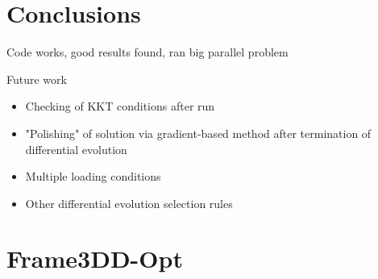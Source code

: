 \documentclass{article}
\begin{document}
\section{Conclusions}
Code works, good results found, ran big parallel problem

Future work
\begin{itemize}
  \item Checking of KKT conditions after run
  \item "Polishing" of solution via gradient-based method after termination of differential evolution
  \item Multiple loading conditions
  \item Other differential evolution selection rules
\end{itemize}

\printbibliography

\appendix

\section{Frame3DD-Opt}

\end{document}
